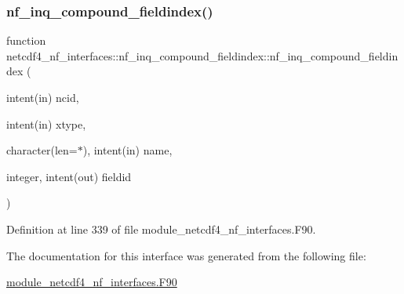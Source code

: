 \subsubsection{\texorpdfstring{nf\+\_\+inq\+\_\+compound\+\_\+fieldindex()}{nf\_inq\_compound\_fieldindex()}}
{\footnotesize\ttfamily function netcdf4\+\_\+nf\+\_\+interfaces\+::nf\+\_\+inq\+\_\+compound\+\_\+fieldindex\+::nf\+\_\+inq\+\_\+compound\+\_\+fieldindex (\begin{DoxyParamCaption}\item[{intent(in)}]{ncid,  }\item[{intent(in)}]{xtype,  }\item[{character(len=$\ast$), intent(in)}]{name,  }\item[{integer, intent(out)}]{fieldid }\end{DoxyParamCaption})}



Definition at line 339 of file module\+\_\+netcdf4\+\_\+nf\+\_\+interfaces.\+F90.



The documentation for this interface was generated from the following file\+:\begin{DoxyCompactItemize}
\item 
\hyperlink{module__netcdf4__nf__interfaces_8F90}{module\+\_\+netcdf4\+\_\+nf\+\_\+interfaces.\+F90}\end{DoxyCompactItemize}
